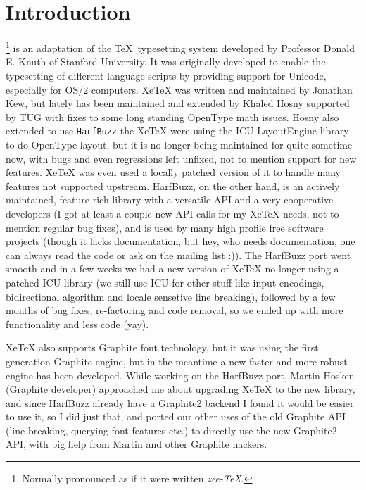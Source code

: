 \section{Introduction}
\XeTeX\footnote{Normally pronounced as if it were written {\em zee-\TeX}.} is an adaptation of the \TeX\ typesetting system developed by Professor Donald E. Knuth of Stanford University. It was originally developed to enable the typesetting of different language scripts by providing support for Unicode, especially for OS/2 computers.  XeTeX was written and maintained by Jonathan Kew, but lately has been maintained and extended by Khaled Hosny supported by TUG with fixes to some long standing OpenType math issues. Hosny also extended \XeTeX to use \texttt{HarfBuzz} the XeTeX were using the ICU LayoutEngine library to do OpenType layout, but it is no longer being maintained for quite sometime now, with bugs and even regressions left unfixed, not to mention support for new features. XeTeX was even used a locally patched version of it to handle many features not supported upstream. HarfBuzz, on the other hand, is an actively maintained, feature rich library with a versatile API and a very cooperative developers (I got at least a couple new API calls for my XeTeX needs, not to mention regular bug fixes), and is used by many high profile free software projects (though it lacks documentation, but hey, who needs documentation, one can always read the code or ask on the mailing list :)). The HarfBuzz port went smooth and in a few weeks we had a new version of XeTeX no longer using a patched ICU library (we still use ICU for other stuff like input encodings, bidirectional algorithm and locale sensetive line breaking), followed by a few months of bug fixes, re-factoring and code removal, so we ended up with more functionality and less code (yay).

XeTeX also supports Graphite font technology, but it was using the first generation Graphite engine, but in the meantime a new faster and more robust engine has been developed. While working on the HarfBuzz port, Martin Hosken (Graphite developer) approached me about upgrading XeTeX to the new library, and since HarfBuzz already have a Graphite2 backend I found it would be easier to use it, so I did just that, and ported our other uses of the old Graphite API (line breaking, querying font features etc.) to directly use the new Graphite2 API, with big help from Martin and other Graphite hackers.


